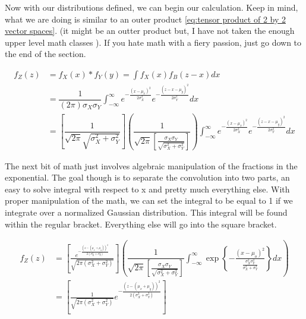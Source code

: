 \documentclass[11pt,a4paper]{book}
\begin{document}
		\noindent
		Now with our distributions defined, we can begin our calculation. Keep in mind, what we are doing is similar to an outer product \autoref{eq:tensor product of 2 by 2 vector spaces}. (it might be an outter product but, I have not taken the enough upper level math classes ). If you hate math with a fiery passion, just go down to the end of the section.
		
		\begin{equation}
			\label{eq:convolution of two Gaussian functions part 1}
			\begin{split}
			f_Z(z) & = f_X(x) \ast f_Y(y) = \int{f_X(x) f_B (z-x) dx}\\
			& = \dfrac{1}{(2 \pi) \sigma_X \sigma_Y} 
			\int_{-\infty}^{\infty}{
				e^{- \frac{(x-\mu_x)^2}{2 \sigma_X^2}} e^{- \frac{(z - x - \mu_y)^2}{2 \sigma_Y^2}}dx} \\
			& = \left[
					\dfrac{1}{\sqrt{2 \pi} \sqrt{\sigma_X^2 + \sigma_Y^2}} 
				\right] 
				\left(
					\dfrac{1}{\sqrt{2 \pi}
					\left[ 
						\frac{\sigma_X \sigma_Y}{\sqrt{\sigma_X^2+\sigma_Y^2}}
					\right]}
				\right)
				\int_{-\infty}^{\infty}{e^{-\frac{(x-\mu_x)^2}{2 \sigma_X^2}}} e^{- \frac{(z-x-\mu_y)^2}{2 \sigma_Y^2}}dx 
			\end{split}
		\end{equation}
		
		The next bit of math just involves algebraic manipulation of the fractions in the exponential. The goal though is to separate the convolution into two parts, an easy to solve integral with respect to x and pretty much everything else. With proper manipulation of the math, we can set the integral to be equal to 1 if we integrate over a normalized Gaussian distribution. This integral will be found within the regular bracket. Everything else will go into the square bracket.
		
		\begin{equation}
			\label{eq:convolution of two Gaussian functions part 2}
			\begin{split}
			f_Z(z) & = \left[
					\frac{e^{-\frac{\left(z-(\mu_x + \mu_y)\right)^2}{2( \sigma_X^2 + \sigma_Y^2)}}}{\sqrt{2 \pi(\sigma_X^2 + \sigma_Y^2)}}
				\right]
				\left(				
					\dfrac{1}{\sqrt{2 \pi}
					\left[ 
						\frac{\sigma_X \sigma_Y}{\sqrt{\sigma_X^2+\sigma_Y^2}}
					\right]}
					\int_{-\infty}^{\infty}\exp{\left\{-\frac{(x-\mu_o)^2}{\frac{\sigma_X^2 \sigma_Y^2}{\sigma_X^2+\sigma_Y^2}}\right\}}dx
				\right) \\
			& = 
			\left[
				\frac{1}{\sqrt{2 \pi(\sigma_X^2 + \sigma_Y^2)}}
				e^{-\frac{\left(z-(\mu_x + \mu_y)\right)^2}{2( \sigma_X^2 + \sigma_Y^2)}}
			\right]
			\end{split} 
		\end{equation}
		
\end{document}
